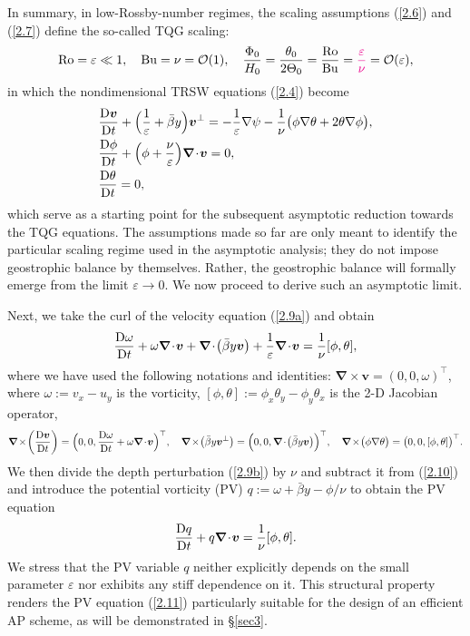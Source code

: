 \documentclass[a4paper,11pt,twoside]{article}
\numberwithin{equation}{section}
\numberwithin{figure}{section}
\numberwithin{table}{section}
\newcommand{\bnabla}{\bm{\nabla}}
\newcommand{\eps}{\varepsilon}
\newcommand{\bv}{\bm{v}}
\newcommand{\Ro}{\mathrm{Ro}}
\newcommand{\Bu}{\mathrm{Bu}}
\newcommand\eref[1]{(\ref{#1})}
\newcommand{\RIIIcolor}[1]{{\leavevmode\color{magenta} #1}}
\begin{document}
In summary, in low-Rossby-number regimes, the scaling assumptions \eref{2.6} and \eref{2.7} define the so-called TQG scaling:
\begin{equation}
\Ro=\eps\ll1,\quad\Bu=\nu={\cal O}(1),\quad\frac{\Phi_0}{H_0}=\frac{\theta_0}{2\Theta_0}=\frac{\Ro}{\Bu}=\RIIIcolor{\frac{\varepsilon}{\nu}}={\cal O}(\eps),
\label{2.8}
\end{equation}
in which the nondimensional TRSW equations \eref{2.4} become
\begin{subequations}
\begin{align}
&\frac{{\rm D}\bv}{{\rm D}t}+\Big(\frac{1}{\eps}+\bar\beta y\Big)\bv^\perp=-\frac{1}{\eps}\nabla\psi-
\frac{1}{\nu}\big(\phi\nabla\theta+2\theta\nabla\phi\big),\label{2.9a}\\
&\frac{{\rm D}\phi}{{\rm D}t}+\Big(\phi+\frac{\nu}{\eps}\Big)\bnabla\!\cdot\!\bv=0,\label{2.9b}\\
&\frac{{\rm D}\theta}{{\rm D}t}=0,\label{2.9c}
\end{align}
\label{2.9}
\end{subequations}
which serve as a starting point for the subsequent asymptotic reduction towards the TQG equations.
%
\RIIIcolor{The assumptions made so far are only meant to identify the particular scaling regime used in the asymptotic analysis; they do not impose geostrophic balance by themselves. Rather, the geostrophic balance will formally emerge from the limit $\varepsilon\to 0$. We now proceed to derive such an asymptotic limit.}


Next, we take the curl of the velocity equation \eref{2.9a} and obtain
\begin{equation}
\frac{{\rm D}\omega}{{\rm D}t}+\omega\bnabla\!\cdot\!\bv+\bnabla\!\cdot\!\big(\bar\beta y\bv\big)+\frac{1}{\eps}\bnabla\!\cdot\!\bv=
\frac{1}{\nu}[\phi,\theta],
\label{2.10}
\end{equation}
where we have used the following notations and identities: $\bnabla\!\times\!\bv=(0,0,\omega)^\top$, where $\omega:=v_x-u_y$ is the
vorticity, $[\phi,\theta]:=\phi_x\theta_y-\phi_y\theta_x$ is the 2-D Jacobian operator,
\begin{equation*}
\bnabla\!\times\!\bigg(\frac{{\rm D}\bv}{{\rm D}t}\bigg)=\Big(0,0,\frac{{\rm D}\omega}{{\rm D}t}+\omega\bnabla\!\cdot\!\bv\Big)^\top,\quad
\bnabla\!\times\!\big(\bar{\beta}y\bv^\perp\big)=\Big(0,0,\bnabla\!\cdot\!\big(\bar\beta y\bv\big)\Big)^\top,\quad
\bnabla\!\times\!\big(\phi\nabla\theta\big)=\big(0,0,[\phi,\theta]\big)^\top.
\end{equation*}
We then divide the depth perturbation \eref{2.9b} by $\nu$ and subtract it from \eref{2.10} and introduce the potential vorticity (PV) 
$q:=\omega+\bar\beta y-\phi/\nu$ to obtain the PV equation
\begin{equation}
\frac{{\rm D}q}{{\rm D}t}+q\bnabla\!\cdot\!\bv=\frac{1}{\nu}[\phi,\theta].
\label{2.11}
\end{equation}
We stress that the PV variable $q$ neither explicitly depends on the small parameter $\eps$ nor exhibits any stiff dependence on it. This 
structural property renders the PV equation \eref{2.11} particularly suitable for the design of an efficient AP scheme, as will be
demonstrated in \S\ref{sec3}. 
\end{document}
